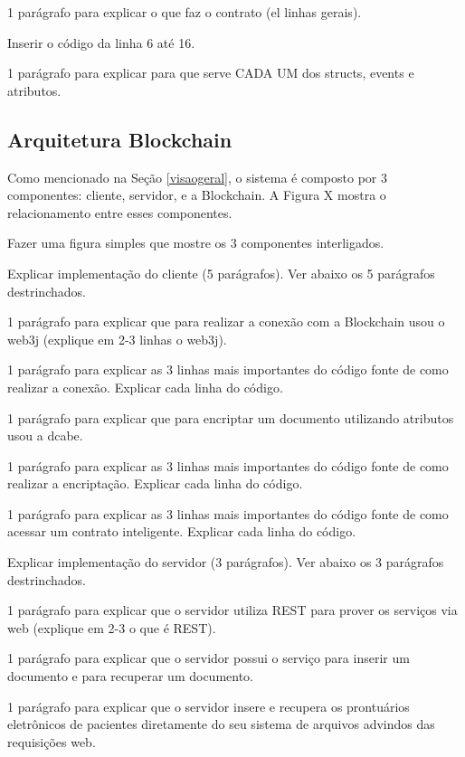 \documentclass[a4paper,11pt]{article}
\begin{document}
{\color{Magenta} 1 parágrafo para explicar o que faz o contrato (el linhas gerais).}

{\color{Magenta} Inserir o código da linha 6 até 16.}

{\color{Magenta} 1 parágrafo para explicar para que serve CADA UM dos structs, events e atributos.}



\subsection{Arquitetura Blockchain}

Como mencionado na Seção \ref{visaogeral}, o sistema é composto por 3 componentes: cliente, servidor, e a Blockchain. A Figura X mostra o relacionamento entre esses componentes.

{\color{ForestGreen} Fazer uma figura simples que mostre os 3 componentes interligados. }


{\color{ForestGreen} Explicar implementação do cliente (5 parágrafos). Ver abaixo os 5 parágrafos destrinchados. }

{\color{Magenta} 1 parágrafo para explicar que para realizar a conexão com a Blockchain usou o web3j (explique em 2-3 linhas o web3j).}

{\color{Magenta} 1 parágrafo para explicar as 3 linhas mais importantes do código fonte de como realizar a conexão. Explicar cada linha do código. }

{\color{Magenta} 1 parágrafo para explicar que para encriptar um documento utilizando atributos usou a dcabe.}

{\color{Magenta} 1 parágrafo para explicar as 3 linhas mais importantes do código fonte de como realizar a encriptação. Explicar cada linha do código.}

{\color{Magenta} 1 parágrafo para explicar as 3 linhas mais importantes do código fonte de como acessar um contrato inteligente. Explicar cada linha do código.}

{\color{ForestGreen} Explicar implementação do servidor (3 parágrafos). Ver abaixo os 3 parágrafos destrinchados. }

{\color{Magenta} 1 parágrafo para explicar que o servidor utiliza REST para prover os serviços via web  (explique em 2-3 o que é REST).}

{\color{Magenta} 1 parágrafo para explicar que o servidor possui o serviço para inserir um documento e para recuperar um documento.}

{\color{Magenta} 1 parágrafo para explicar que o servidor insere e recupera os prontuários eletrônicos de pacientes diretamente do seu sistema de arquivos advindos das requisições web.}
\end{document}

